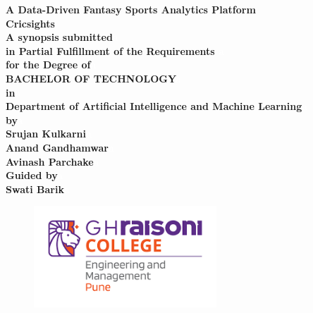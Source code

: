 \begin{center}
\renewcommand{\baselinestretch}{1.8}

{\huge \bf A Data-Driven Fantasy Sports Analytics Platform}\\
\vspace{0.1 in}
{\huge \bf Cricsights}\\
\vspace{0.15 in}
{\small \bf A synopsis submitted\textcolor{white}{a}}\\
\vspace{0.15 in}
{\small \bf in Partial Fulfillment of the Requirements \textcolor{white}{a}}\\ 
\vspace{0.15 in}
{\small \bf for the Degree of\textcolor{white}{a}}\\ 
\vspace{0.15 in}
{\large \bf BACHELOR OF TECHNOLOGY\textcolor{white}{a}}\\ 
\vspace{0.15 in}
{\small \bf in\textcolor{white}{a}}\\ 
\vspace{0.15 in}
{\large \bf Department of Artificial Intelligence and Machine Learning\textcolor{white}{a}}\\ 
\vspace{0.15 in}
{\small \bf by\textcolor{white}{a}}\\ 
\vspace{0.15 in}
{\large \bf Srujan Kulkarni\textcolor{white}{a}}\\ 
\vspace{0.15 in}
{\large \bf Anand Gandhamwar\textcolor{white}{a}}\\ 
\vspace{0.15 in}
{\large \bf Avinash Parchake\textcolor{white}{a}}\\ 
\vspace{0.15 in}
{\small \bf Guided by\textcolor{white}{a}}\\ 
\vspace{0.15 in}
{\large \bf Swati Barik\textcolor{white}{a}}\\ 

\begin{figure}[!h]
\centering
\includegraphics[width=2.7in]{GHRCE_LOGO.png}
\end{figure}


\end{center}
